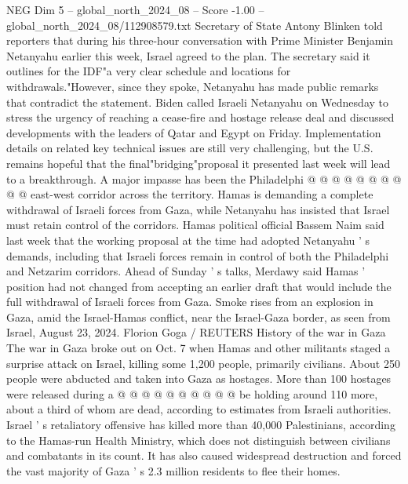 \begin{textsample}{NEG Dim 5 – global\_north\_2024\_08 – Score -1.00 – global\_north\_2024\_08/112908579.txt}
Secretary of State Antony Blinken told reporters that during his three-hour conversation with Prime Minister Benjamin Netanyahu earlier this week, Israel agreed to the plan.
The secretary said it outlines for the IDF"a very clear schedule and locations for withdrawals."However, since they spoke, Netanyahu has made public remarks that contradict the statement.
Biden called Israeli Netanyahu on Wednesday to stress the urgency of reaching a cease-fire and hostage release deal and discussed developments with the leaders of Qatar and Egypt on Friday.
Implementation details on related key technical issues are still very challenging, but the U.S. remains hopeful that the final"bridging"proposal it presented last week will lead to a breakthrough.
A major impasse has been the Philadelphi @ @ @ @ @ @ @ @ @ @ east-west corridor across the territory.
Hamas is demanding a complete withdrawal of Israeli forces from Gaza, while Netanyahu has insisted that Israel must retain control of the corridors.
Hamas political official Bassem Naim said last week that the working proposal at the time had adopted Netanyahu ' s demands, including that Israeli forces remain in control of both the Philadelphi and Netzarim corridors.
Ahead of Sunday ' s talks, Merdawy said Hamas ' position had not changed from accepting an earlier draft that would include the full withdrawal of Israeli forces from Gaza.
Smoke rises from an explosion in Gaza, amid the Israel-Hamas conflict, near the Israel-Gaza border, as seen from Israel, August 23, 2024.
Florion Goga / REUTERS History of the war in Gaza The war in Gaza broke out on Oct. 7 when Hamas and other militants staged a surprise attack on Israel, killing some 1,200 people, primarily civilians.
About 250 people were abducted and taken into Gaza as hostages.
More than 100 hostages were released during a @ @ @ @ @ @ @ @ @ @ be holding around 110 more, about a third of whom are dead, according to estimates from Israeli authorities.
Israel ' s retaliatory offensive has killed more than 40,000 Palestinians, according to the Hamas-run Health Ministry, which does not distinguish between civilians and combatants in its count.
It has also caused widespread destruction and forced the vast majority of Gaza ' s 2.3 million residents to flee their homes.

\end{textsample}
